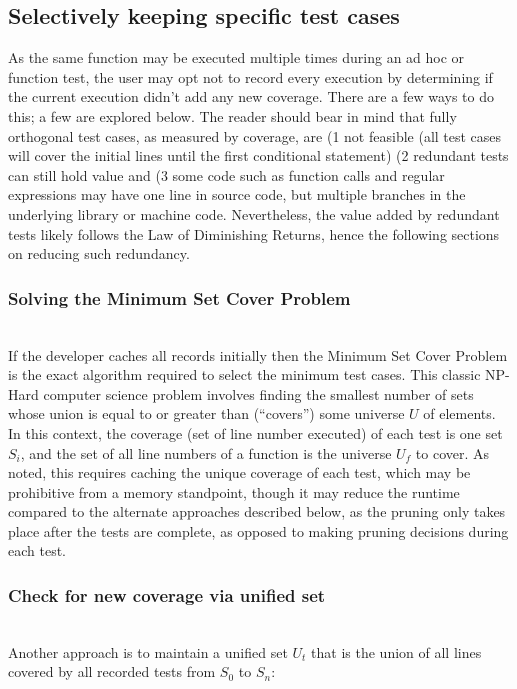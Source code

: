 \subsection{Selectively keeping specific test cases}\label{sec:tuning-1}
As the same function may be executed multiple times during an ad hoc or 
function test, the user may opt not to record every execution by determining
if the current execution didn’t add any new coverage. There are a few 
ways to do this; a few are explored below. The reader should bear in mind
that fully orthogonal test cases, as measured by coverage, are (1 not feasible 
(all test cases will cover the initial lines until the first conditional statement) 
(2 redundant tests can still hold value and (3 some code such as function calls 
and regular expressions may have one line in source code, but multiple branches in the 
underlying library or machine code.  Nevertheless, the value added by redundant tests
likely follows the Law of Diminishing Returns, hence the following sections
on reducing such redundancy.
 
 \subsubsection{Solving the Minimum Set Cover Problem}\label{sec:tuning-2}
 \hfill\\
If the developer caches all records initially then the Minimum Set Cover Problem
\cite{hassin2005better} is the exact algorithm required to select the minimum test cases.
This classic NP-Hard computer science problem involves finding the smallest number
  of sets whose union is equal to or greater than (“covers”) some universe $U$ of elements.  
  In this context, the coverage (set of line number executed) of each test is one set $S_i$,
 and the set of all line numbers of a function is the universe $U_f$ to cover.  
 As noted, this requires caching the unique coverage of each test, which may 
 be prohibitive from a memory standpoint, though it may reduce the runtime 
 compared to the alternate approaches described below, as the pruning 
 only takes place after the tests are complete, as opposed to making 
 pruning decisions during each test.

\subsubsection{Check for new coverage via unified set}\label{sec:tuning-2}
\hfill\\
Another approach is to maintain a unified set $U_t$ that is the union of all lines 
covered by all recorded tests from $S_0$ to $S_n$: 

